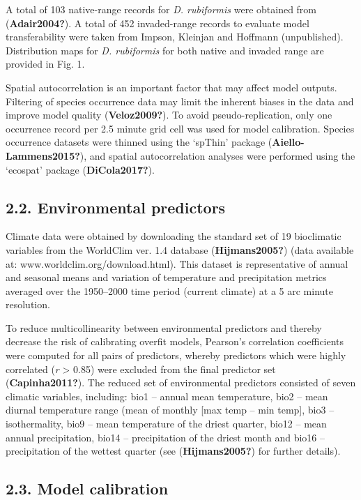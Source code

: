 \documentclass[12pt,]{article}
\begin{document}
A total of 103 native-range records for \emph{D. rubiformis} were
obtained from (\textbf{Adair2004?}). A total of 452 invaded-range
records to evaluate model transferability were taken from Impson,
Kleinjan and Hoffmann (unpublished). Distribution maps for \emph{D.
rubiformis} for both native and invaded range are provided in Fig. 1.

Spatial autocorrelation is an important factor that may affect model
outputs. Filtering of species occurrence data may limit the inherent
biases in the data and improve model quality (\textbf{Veloz2009?}). To
avoid pseudo-replication, only one occurrence record per 2.5 minute grid
cell was used for model calibration. Species occurrence datasets were
thinned using the `spThin' package (\textbf{Aiello-Lammens2015?}), and
spatial autocorrelation analyses were performed using the `ecospat'
package (\textbf{DiCola2017?}).

\hypertarget{environmental-predictors}{%
\subsection{2.2. Environmental
predictors}\label{environmental-predictors}}

Climate data were obtained by downloading the standard set of 19
bioclimatic variables from the WorldClim ver. 1.4 database
(\textbf{Hijmans2005?}) (data available at:
www.worldclim.org/download.html). This dataset is representative of
annual and seasonal means and variation of temperature and precipitation
metrics averaged over the 1950--2000 time period (current climate) at a
5 arc minute resolution.

To reduce multicollinearity between environmental predictors and thereby
decrease the risk of calibrating overfit models, Pearson's correlation
coefficients were computed for all pairs of predictors, whereby
predictors which were highly correlated (\textbar{}\emph{r}\textbar{}
\textgreater{} 0.85) were excluded from the final predictor set
(\textbf{Capinha2011?}). The reduced set of environmental predictors
consisted of seven climatic variables, including: bio1 -- annual mean
temperature, bio2 -- mean diurnal temperature range (mean of monthly
{[}max temp -- min temp{]}, bio3 -- isothermality, bio9 -- mean
temperature of the driest quarter, bio12 -- mean annual precipitation,
bio14 -- precipitation of the driest month and bio16 -- precipitation of
the wettest quarter (see (\textbf{Hijmans2005?}) for further details).

\hypertarget{model-calibration}{%
\subsection{2.3. Model calibration}\label{model-calibration}}
\end{document}
